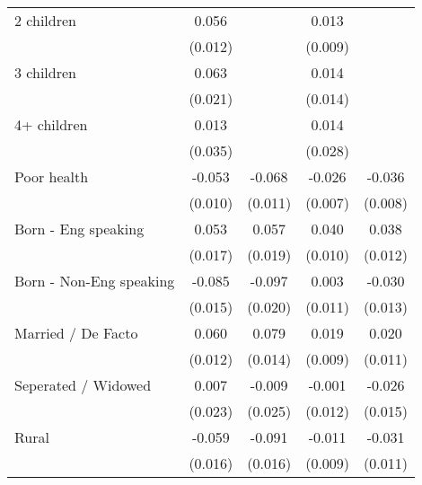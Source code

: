 {\begin{tabular}{l*{4}{c}}
2 children          &       0.056\sym{***}&                     &       0.013         &                     \\
                    &     (0.012)         &                     &     (0.009)         &                     \\
3 children          &       0.063\sym{***}&                     &       0.014         &                     \\
                    &     (0.021)         &                     &     (0.014)         &                     \\
4+ children         &       0.013         &                     &       0.014         &                     \\
                    &     (0.035)         &                     &     (0.028)         &                     \\
Poor health         &      -0.053\sym{***}&      -0.068\sym{***}&      -0.026\sym{***}&      -0.036\sym{***}\\
                    &     (0.010)         &     (0.011)         &     (0.007)         &     (0.008)         \\
Born - Eng speaking &       0.053\sym{***}&       0.057\sym{***}&       0.040\sym{***}&       0.038\sym{***}\\
                    &     (0.017)         &     (0.019)         &     (0.010)         &     (0.012)         \\
Born - Non-Eng speaking&      -0.085\sym{***}&      -0.097\sym{***}&       0.003         &      -0.030\sym{**} \\
                    &     (0.015)         &     (0.020)         &     (0.011)         &     (0.013)         \\
Married / De Facto  &       0.060\sym{***}&       0.079\sym{***}&       0.019\sym{**} &       0.020\sym{*}  \\
                    &     (0.012)         &     (0.014)         &     (0.009)         &     (0.011)         \\
Seperated / Widowed &       0.007         &      -0.009         &      -0.001         &      -0.026\sym{*}  \\
                    &     (0.023)         &     (0.025)         &     (0.012)         &     (0.015)         \\
Rural               &      -0.059\sym{***}&      -0.091\sym{***}&      -0.011         &      -0.031\sym{***}\\
                    &     (0.016)         &     (0.016)         &     (0.009)         &     (0.011)         \\

\end{tabular}}
